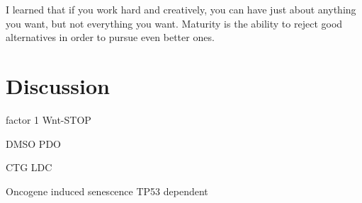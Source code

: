 \begin{savequote}[75mm]
I learned that if you work hard and creatively, you can have just about anything you want, but not everything you want. Maturity is the ability to reject good alternatives in order to pursue even better ones.

\end{savequote}

\chapter{Discussion}

factor 1
Wnt-STOP

\label{conclusion}

DMSO
PDO

CTG
LDC

Oncogene induced senescence 
TP53 dependent 
